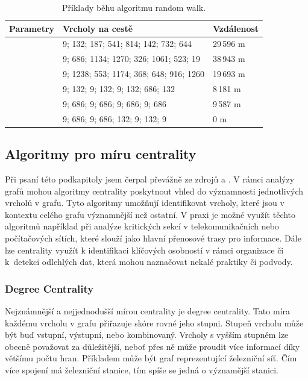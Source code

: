 \documentclass[
  program=infoi,
  biblatex=true,
  figures=true,
  glossaries=false,
  index,
  sourcecodes=true
]{kidiplom}
\begin{document}
\begin{table}[h]
\caption[Random walk]{Příklady běhu algoritmu random walk.}
\label{tab:randomWalk}
\begin{tabularx}{\textwidth}{ | X | l | l | }
 \hline
 \textbf{Parametry} & \textbf{Vrcholy na cestě} & \textbf{Vzdálenost} \\
 \hline \hline
  & 9; 132; 187; 541; 814; 142; 732; 644 & 29\,596 m \\
 & 9; 686; 1134; 1270; 326; 1061; 523; 19 & 38\,943 m \\
 & 9; 1238; 553; 1174; 368; 648; 916; 1260 & 19\,693 m \\
 \hline
  & 9; 132; 9; 132; 9; 132; 686; 132 & 8\,181 m \\
 & 9; 686; 9; 686; 9; 686; 9; 686 & 9\,587 m \\
 & 9; 686; 9; 686; 132; 9; 132; 9 & 0 m \\
 \hline
\end{tabularx}
\end{table}

\subsection{Algoritmy pro míru centrality}
Při psaní této podkapitoly jsem čerpal převážně ze zdrojů \cite{inAction} a \cite{graphAlgorithms}. V rámci analýzy grafů mohou algoritmy centrality poskytnout vhled do významnosti jednotlivých vrcholů v grafu. Tyto algoritmy umožňují identifikovat vrcholy, které jsou v kontextu celého grafu významnější než ostatní. V praxi je možné využít těchto algoritmů například při analýze kritických sekcí v telekomunikačních nebo počítačových sítích, které slouží jako hlavní přenosové trasy pro informace. Dále lze centrality využít k identifikaci klíčových osobností v rámci organizace či k~detekci odlehlých dat, která mohou naznačovat nekalé praktiky či podvody.

\subsubsection{Degree Centrality}
Nejznámnější a nejjednodušší mírou centrality je degree centrality. Tato míra každému vrcholu v grafu přiřazuje skóre rovné jeho stupni. Stupeň vrcholu může být buď vstupní, výstupní, nebo kombinovaný. Vrcholy s vyšším stupněm lze obecně považovat za důležitější, neboť přes ně může proudit více informací díky většímu počtu hran. Příkladem může být graf reprezentující železniční síť. Čím více spojení má železniční stanice, tím spíše se jedná o významější stanici.
\end{document}

